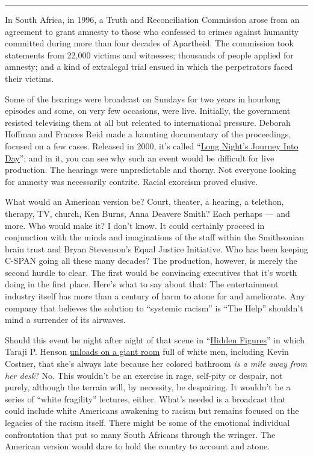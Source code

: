\begin{center}\rule{0.5\linewidth}{\linethickness}\end{center}

In South Africa, in 1996, a Truth and Reconciliation Commission arose
from an agreement to grant amnesty to those who confessed to crimes
against humanity committed during more than four decades of Apartheid.
The commission took statements from 22,000 victims and witnesses;
thousands of people applied for amnesty; and a kind of extralegal trial
ensued in which the perpetrators faced their victims.

Some of the hearings were broadcast on Sundays for two years in hourlong
episodes and some, on very few occasions, were live. Initially, the
government resisted televising them at all but relented to international
pressure. Deborah Hoffman and Frances Reid made a haunting documentary
of the proceedings, focused on a few cases. Released in 2000, it's
called
``\href{https://www.nytimes.com/2000/03/29/movies/film-review-following-south-africa-s-wrenching-road-to-truth.html}{Long
Night's Journey Into Day}''; and in it, you can see why such an event
would be difficult for live production. The hearings were unpredictable
and thorny. Not everyone looking for amnesty was necessarily contrite.
Racial exorcism proved elusive.

What would an American version be? Court, theater, a hearing, a
telethon, therapy, TV, church, Ken Burns, Anna Deavere Smith? Each
perhaps --- and more. Who would make it? I don't know. It could
certainly proceed in conjunction with the minds and imaginations of the
staff within the Smithsonian brain trust and Bryan Stevenson's Equal
Justice Initiative. Who has been keeping C-SPAN going all these many
decades? The production, however, is merely the second hurdle to clear.
The first would be convincing executives that it's worth doing in the
first place. Here's what to say about that: The entertainment industry
itself has more than a century of harm to atone for and ameliorate. Any
company that believes the solution to ``systemic racism'' is ``The
Help'' shouldn't mind a surrender of its airwaves.

Should this event be night after night of that scene in
``\href{https://www.nytimes.com/2016/12/22/movies/hidden-figures-review.html}{Hidden
Figures}'' in which Taraji P. Henson
\href{https://www.youtube.com/watch?v=9j6p7ajuh-E}{unloads on a giant
room} full of white men, including Kevin Costner, that she's always late
because her colored bathroom \emph{is a mile away from her desk}? No.
This wouldn't be an exercise in rage, self-pity or despair, not purely,
although the terrain will, by necessity, be despairing. It wouldn't be a
series of ``white fragility'' lectures, either. What's needed is a
broadcast that could include white Americans awakening to racism but
remains focused on the legacies of the racism itself. There might be
some of the emotional individual confrontation that put so many South
Africans through the wringer. The American version would dare to hold
the country to account and atone.


